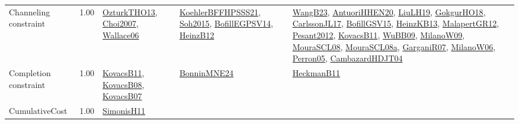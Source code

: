 {\begin{longtable}{p{3cm}r>{\raggedright\arraybackslash}p{6cm}>{\raggedright\arraybackslash}p{6cm}>{\raggedright\arraybackslash}p{8cm}}
\index{Channeling constraint}\index{Constraints!Channeling constraint}Channeling constraint &  1.00 & \hyperref[detail:OzturkTHO13]{OzturkTHO13}, \hyperref[detail:Choi2007]{Choi2007}, \hyperref[detail:Wallace06]{Wallace06} & \hyperref[detail:KoehlerBFFHPSSS21]{KoehlerBFFHPSSS21}, \hyperref[detail:Soh2015]{Soh2015}, \hyperref[detail:BofillEGPSV14]{BofillEGPSV14}, \hyperref[detail:HeinzB12]{HeinzB12} & \hyperref[detail:WangB23]{WangB23}, \hyperref[detail:AntuoriHHEN20]{AntuoriHHEN20}, \hyperref[detail:LiuLH19]{LiuLH19}, \hyperref[detail:GokgurHO18]{GokgurHO18}, \hyperref[detail:CarlssonJL17]{CarlssonJL17}, \hyperref[detail:BofillGSV15]{BofillGSV15}, \hyperref[detail:HeinzKB13]{HeinzKB13}, \hyperref[detail:MalapertGR12]{MalapertGR12}, \hyperref[detail:Pesant2012]{Pesant2012}, \hyperref[detail:KovacsB11]{KovacsB11}, \hyperref[detail:WuBB09]{WuBB09}, \hyperref[detail:MilanoW09]{MilanoW09}, \hyperref[detail:MouraSCL08]{MouraSCL08}, \hyperref[detail:MouraSCL08a]{MouraSCL08a}, \hyperref[detail:GarganiR07]{GarganiR07}, \hyperref[detail:MilanoW06]{MilanoW06}, \hyperref[detail:Perron05]{Perron05}, \hyperref[detail:CambazardHDJT04]{CambazardHDJT04}\\
\index{Completion constraint}\index{Constraints!Completion constraint}Completion constraint &  1.00 & \hyperref[detail:KovacsB11]{KovacsB11}, \hyperref[detail:KovacsB08]{KovacsB08}, \hyperref[detail:KovacsB07]{KovacsB07} & \hyperref[detail:BonninMNE24]{BonninMNE24} & \hyperref[detail:HeckmanB11]{HeckmanB11}\\
\index{CumulativeCost}\index{Constraints!CumulativeCost}CumulativeCost &  1.00 & \hyperref[detail:SimonisH11]{SimonisH11} &  & \\

\end{longtable}}
